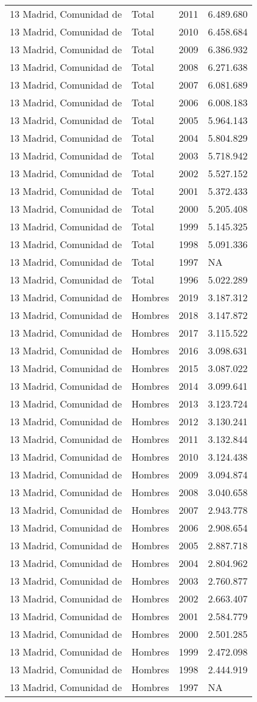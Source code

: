 \documentclass[
]{article}
\begin{document}
\begin{longtable}[]{@{}llrl@{}}
13 Madrid, Comunidad de & Total & 2011 & 6.489.680\tabularnewline
13 Madrid, Comunidad de & Total & 2010 & 6.458.684\tabularnewline
13 Madrid, Comunidad de & Total & 2009 & 6.386.932\tabularnewline
13 Madrid, Comunidad de & Total & 2008 & 6.271.638\tabularnewline
13 Madrid, Comunidad de & Total & 2007 & 6.081.689\tabularnewline
13 Madrid, Comunidad de & Total & 2006 & 6.008.183\tabularnewline
13 Madrid, Comunidad de & Total & 2005 & 5.964.143\tabularnewline
13 Madrid, Comunidad de & Total & 2004 & 5.804.829\tabularnewline
13 Madrid, Comunidad de & Total & 2003 & 5.718.942\tabularnewline
13 Madrid, Comunidad de & Total & 2002 & 5.527.152\tabularnewline
13 Madrid, Comunidad de & Total & 2001 & 5.372.433\tabularnewline
13 Madrid, Comunidad de & Total & 2000 & 5.205.408\tabularnewline
13 Madrid, Comunidad de & Total & 1999 & 5.145.325\tabularnewline
13 Madrid, Comunidad de & Total & 1998 & 5.091.336\tabularnewline
13 Madrid, Comunidad de & Total & 1997 & NA\tabularnewline
13 Madrid, Comunidad de & Total & 1996 & 5.022.289\tabularnewline
13 Madrid, Comunidad de & Hombres & 2019 & 3.187.312\tabularnewline
13 Madrid, Comunidad de & Hombres & 2018 & 3.147.872\tabularnewline
13 Madrid, Comunidad de & Hombres & 2017 & 3.115.522\tabularnewline
13 Madrid, Comunidad de & Hombres & 2016 & 3.098.631\tabularnewline
13 Madrid, Comunidad de & Hombres & 2015 & 3.087.022\tabularnewline
13 Madrid, Comunidad de & Hombres & 2014 & 3.099.641\tabularnewline
13 Madrid, Comunidad de & Hombres & 2013 & 3.123.724\tabularnewline
13 Madrid, Comunidad de & Hombres & 2012 & 3.130.241\tabularnewline
13 Madrid, Comunidad de & Hombres & 2011 & 3.132.844\tabularnewline
13 Madrid, Comunidad de & Hombres & 2010 & 3.124.438\tabularnewline
13 Madrid, Comunidad de & Hombres & 2009 & 3.094.874\tabularnewline
13 Madrid, Comunidad de & Hombres & 2008 & 3.040.658\tabularnewline
13 Madrid, Comunidad de & Hombres & 2007 & 2.943.778\tabularnewline
13 Madrid, Comunidad de & Hombres & 2006 & 2.908.654\tabularnewline
13 Madrid, Comunidad de & Hombres & 2005 & 2.887.718\tabularnewline
13 Madrid, Comunidad de & Hombres & 2004 & 2.804.962\tabularnewline
13 Madrid, Comunidad de & Hombres & 2003 & 2.760.877\tabularnewline
13 Madrid, Comunidad de & Hombres & 2002 & 2.663.407\tabularnewline
13 Madrid, Comunidad de & Hombres & 2001 & 2.584.779\tabularnewline
13 Madrid, Comunidad de & Hombres & 2000 & 2.501.285\tabularnewline
13 Madrid, Comunidad de & Hombres & 1999 & 2.472.098\tabularnewline
13 Madrid, Comunidad de & Hombres & 1998 & 2.444.919\tabularnewline
13 Madrid, Comunidad de & Hombres & 1997 & NA\tabularnewline

\end{longtable}
\end{document}
